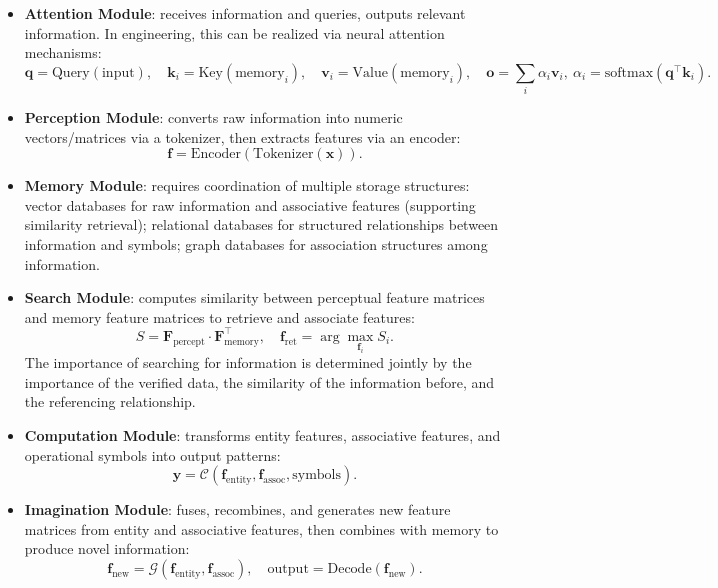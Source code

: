 \documentclass[12pt,a4paper]{article}
\begin{document}
\begin{itemize}
\item \textbf{Attention Module}: receives information and queries, outputs relevant information. In engineering, this can be realized via neural attention mechanisms:
\[
\mathbf{q} = \text{Query}(\text{input}), \quad \mathbf{k}_i = \text{Key}(\text{memory}_i), \quad \mathbf{v}_i = \text{Value}(\text{memory}_i), \quad \mathbf{o} = \sum_i \alpha_i \mathbf{v}_i, 
\ \alpha_i = \text{softmax}(\mathbf{q}^\top \mathbf{k}_i).
\]
\item \textbf{Perception Module}: converts raw information into numeric vectors/matrices via a tokenizer, then extracts features via an encoder:
\[
\mathbf{f} = \text{Encoder}(\text{Tokenizer}(\mathbf{x})).
\]
\item \textbf{Memory Module}: requires coordination of multiple storage structures: vector databases for raw information and associative features (supporting similarity retrieval); relational databases for structured relationships between information and symbols; graph databases for association structures among information.
\item \textbf{Search Module}: computes similarity between perceptual feature matrices and memory feature matrices to retrieve and associate features:
\[
S = \mathbf{F}_{\text{percept}} \cdot \mathbf{F}_{\text{memory}}^\top, \quad \mathbf{f}_{\text{ret}} = \arg\max_{\mathbf{f}_i} S_i.
\]
The importance of searching for information is determined jointly by the importance of the verified data, the similarity of the information before, and the referencing relationship.
\item \textbf{Computation Module}: transforms entity features, associative features, and operational symbols into output patterns:
\[
\mathbf{y} = \mathcal{C}(\mathbf{f}_{\text{entity}}, \mathbf{f}_{\text{assoc}}, \text{symbols}).
\]
\item \textbf{Imagination Module}: fuses, recombines, and generates new feature matrices from entity and associative features, then combines with memory to produce novel information:
\[
\mathbf{f}_{\text{new}} = \mathcal{G}(\mathbf{f}_{\text{entity}}, \mathbf{f}_{\text{assoc}}), \quad \text{output} = \text{Decode}(\mathbf{f}_{\text{new}}).
\]
\end{itemize}
\end{document}
